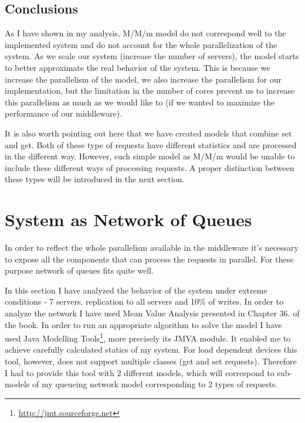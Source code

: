 \documentclass[11pt]{article}
\begin{document}
\subsection{Conclusions}
As I have shown in my analysis, M/M/m model do not correspond well to the implemented system and do not account for the whole parallelization of the system. As we scale our system (increase the number of servers), the model starts to better approximate the real behavior of the system. This is because we increase the parallelism of the model, we also increase the parallelism for our implementation, but the limitation in the number of cores prevent us to increase this parallelism as much as we would like to (if we wanted to maximize the performance of our middleware).

It is also worth pointing out here that we have created models that combine set and get. Both of these type of requests have different statistics and are processed in the different way. However, such simple model as M/M/m would be unable to include these different ways of processing requests. A proper distinction between these types will be introduced in the next section.

\clearpage

\section{System as Network of Queues}\label{sec:network-of-queues}

\iffalse
Length: 1-3 pages

Based on the outcome of the different modeling efforts from the previous sections, build a comprehensive network of queues model for the whole system. Compare it with experimental data and use the methods discussed in the lecture and the book to provide an in-depth analysis of the behavior. This includes the identification and analysis of bottlenecks in your system. Make sure to follow the model-related guidelines described in the Notes!
\fi
In order to reflect the whole parallelism available in the middleware it's necessary to expose all the components that can process the requests in parallel. For these purpose network of queues fits quite well.

In this section I have analyzed the behavior of the system under extreme conditions - 7 servers, replication to all servers and 10\% of writes. In order to analyze the network I have used Mean Value Analysis presented in Chapter 36. of the book. In order to run an appropriate algorithm to solve the model I have used Java Modelling Tools\footnote{\url{http://jmt.sourceforge.net}}, more precisely its JMVA module. It enabled me to achieve carefully calculated statics of my system. For load dependent devices this tool, however, does not support multiple classes (get and set requests). Therefore I had to provide this tool with 2 different models, which will correspond to sub-models of my queueing network model corresponding to 2 types of requests.
\end{document}
